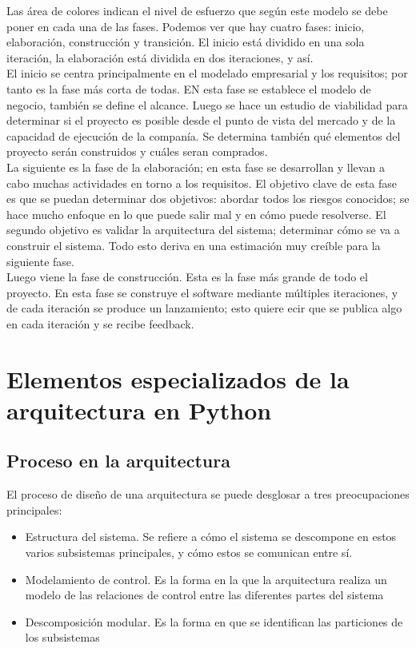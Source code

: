 Las área de colores indican el nivel de esfuerzo que según este modelo se debe poner en cada una de las fases. Podemos ver que hay cuatro fases: inicio, elaboración, construcción y transición. El inicio está dividido en una sola iteración, la elaboración está dividida en dos iteraciones, y así.\\
El inicio se centra principalmente en el modelado empresarial y los requisitos; por tanto es la fase más corta de todas. EN esta fase se establece el modelo de negocio, también se define el alcance. Luego se hace un estudio de viabilidad para determinar si el proyecto es posible desde el punto de vista del mercado y de la capacidad de ejecución de la companía. Se determina también qué elementos del proyecto serán construidos y cuáles seran comprados. \\
La siguiente es la fase de la elaboración; en esta fase se desarrollan y llevan a cabo muchas actividades en torno a los requisitos. El objetivo clave de esta fase es que se puedan determinar dos objetivos: abordar todos los riesgos conocidos; se hace mucho enfoque en lo que puede salir mal y en cómo puede resolverse. El segundo objetivo es validar la arquitectura del sistema; determinar cómo se va a construir el sistema. Todo esto deriva en una estimación muy creíble para la siguiente fase. \\
Luego viene la fase de construcción. Esta es la fase más grande de todo el proyecto. En esta fase se construye el software mediante múltiples iteraciones, y de cada iteración se produce un lanzamiento; esto quiere ecir que se publica algo en cada iteración y se recibe feedback. 


\section{Elementos especializados de la arquitectura en Python}

\subsection{Proceso en la arquitectura} 

El proceso de diseño de una arquitectura se puede desglosar a tres preocupaciones principales:

\begin{itemize}
    \item Estructura del sistema. Se refiere a cómo el sistema se descompone en estos varios subsistemas principales, y cómo estos se comunican entre sí.
    \item Modelamiento de control. Es la forma en la que la arquitectura realiza un modelo de las relaciones de control entre las diferentes partes del sistema
    \item Descomposición modular. Es la forma en que se identifican las particiones de los subsistemas
\end{itemize}

